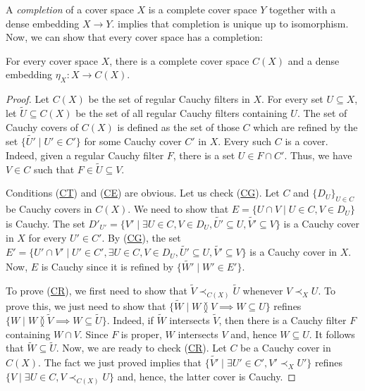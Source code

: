 \documentclass[reqno]{amsart}
\newcommand{\axref}[1]{(\hyperref[ax:#1]{#1})}
\theoremstyle{definition}
\theoremstyle{remark}
\numberwithin{figure}{section}
\newcommand{\overlap}[2]{#1 \between #2}
\newcommand{\rb}{\prec}
\begin{document}
A \emph{completion} of a cover space $X$ is a complete cover space $Y$ together with a dense embedding $X \to Y$.
 implies that completion is unique up to isomorphism.
Now, we can show that every cover space has a completion:

\begin{thm}[completion]
For every cover space $X$, there is a complete cover space $C(X)$ and a dense embedding $\eta_X : X \to C(X)$.
\end{thm}
\begin{proof}
Let $C(X)$ be the set of regular Cauchy filters in $X$.
For every set $U \subseteq X$, let $\widetilde{U} \subseteq C(X)$ be the set of all regular Cauchy filters containing $U$.
The set of Cauchy covers of $C(X)$ is defined as the set of those $C$ which are refined by the set $\{ \widetilde{U'} \mid U' \in C' \}$ for some Cauchy cover $C'$ in $X$.
Every such $C$ is a cover.
Indeed, given a regular Cauchy filter $F$, there is a set $U \in F \cap C'$.
Thus, we have $V \in C$ such that $F \in \widetilde{U} \subseteq V$.

Conditions \axref{CT} and \axref{CE} are obvious.
Let us check \axref{CG}.
Let $C$ and $\{ D_U \}_{U \in C}$ be Cauchy covers in $C(X)$.
We need to show that $E = \{ U \cap V \mid U \in C, V \in D_U \}$ is Cauchy.
The set $D'_{U'} = \{ V' \mid \exists U \in C, V \in D_U, \widetilde{U'} \subseteq U, \widetilde{V'} \subseteq V \}$ is a Cauchy cover in $X$ for every $U' \in C'$.
By \axref{CG}, the set $E' = \{ U' \cap V' \mid U' \in C', \exists U \in C, V \in D_U, \widetilde{U'} \subseteq U, \widetilde{V'} \subseteq V \}$ is a Cauchy cover in $X$.
Now, $E$ is Cauchy since it is refined by $\{ \widetilde{W'} \mid W' \in E' \}$.

To prove \axref{CR}, we first need to show that $\widetilde{V} \rb_{C(X)} \widetilde{U}$ whenever $V \rb_X U$.
To prove this, we just need to show that $\{ \widetilde{W} \mid \overlap{W}{V} \implies W \subseteq U \}$ refines $\{ W \mid \overlap{W}{\widetilde{V}} \implies W \subseteq \widetilde{U} \}$.
Indeed, if $\widetilde{W}$ intersects $\widetilde{V}$, then there is a Cauchy filter $F$ containing $W \cap V$.
Since $F$ is proper, $W$ intersects $V$ and, hence $W \subseteq U$.
It follows that $\widetilde{W} \subseteq \widetilde{U}$.
Now, we are ready to check \axref{CR}.
Let $C$ be a Cauchy cover in $C(X)$.
The fact we just proved implies that $\{ \widetilde{V'} \mid \exists U' \in C', V' \rb_X U' \}$ refines $\{ V \mid \exists U \in C, V \rb_{C(X)} U \}$ and, hence, the latter cover is Cauchy.


\end{proof}
\end{document}
